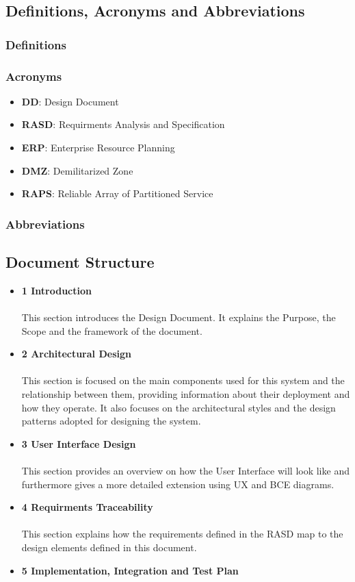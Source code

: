 \documentclass[12pt,a4paper]{article}
\begin{document}
 	\subsection{Definitions, Acronyms and Abbreviations}
 		\subsubsection{Definitions}
 		\subsubsection{Acronyms}
 			\begin{itemize}
 				\item \textbf{DD}: Design Document
 				\item \textbf{RASD}: Requirments Analysis and Specification
 				\item \textbf{ERP}: Enterprise Resource Planning
 				\item \textbf{DMZ}: Demilitarized Zone
 				\item \textbf{RAPS}: Reliable Array of Partitioned Service
 			\end{itemize}
 		\subsubsection{Abbreviations}
	\subsection{Document Structure}
		\begin{itemize}
			\item \textbf{1 Introduction}\\\\
			This section introduces the Design Document. It explains the Purpose, the Scope and the framework of the document.
			\item \textbf{2 Architectural Design}\\\\
			This section is focused on the main components used for this system and the relationship between them, providing information about their deployment and how they operate. It also focuses on the architectural styles and the design patterns adopted for designing the system.
			\item \textbf{3 User Interface Design}\\\\
			This section provides an overview on how the User Interface will look like and furthermore gives a more detailed extension using UX and BCE diagrams.
			\item \textbf{4 Requirments Traceability}\\\\
			This section explains how the requirements defined in the RASD map to the design elements defined in this document.
			\item \textbf{5 Implementation, Integration and Test Plan}
		\end{itemize}
\newpage
\end{document}
